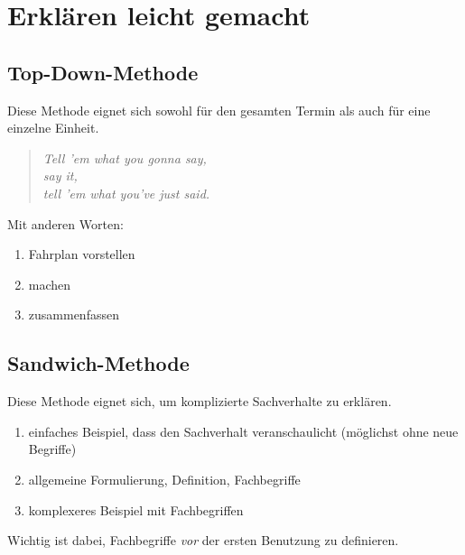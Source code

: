 \section{Erklären leicht gemacht}
\label{erklaeren}

\subsection{Top-Down-Methode}
Diese Methode eignet sich sowohl für den gesamten Termin als auch für eine einzelne Einheit.

\begin{quote}
  \emph{Tell 'em what you gonna say,\\
  say it,\\
  tell 'em what you've just said.}
\end{quote}

Mit anderen Worten:
\begin{enumerate}
  \item Fahrplan vorstellen
  \item machen
  \item zusammenfassen
\end{enumerate}

\subsection{Sandwich-Methode}
Diese Methode eignet sich, um komplizierte Sachverhalte zu erklären.

\begin{enumerate}
  \item einfaches Beispiel, dass den Sachverhalt veranschaulicht (möglichst ohne neue Begriffe)
  \item allgemeine Formulierung, Definition, Fachbegriffe
  \item komplexeres Beispiel mit Fachbegriffen
\end{enumerate}

Wichtig ist dabei, Fachbegriffe \emph{vor} der ersten Benutzung zu definieren.
